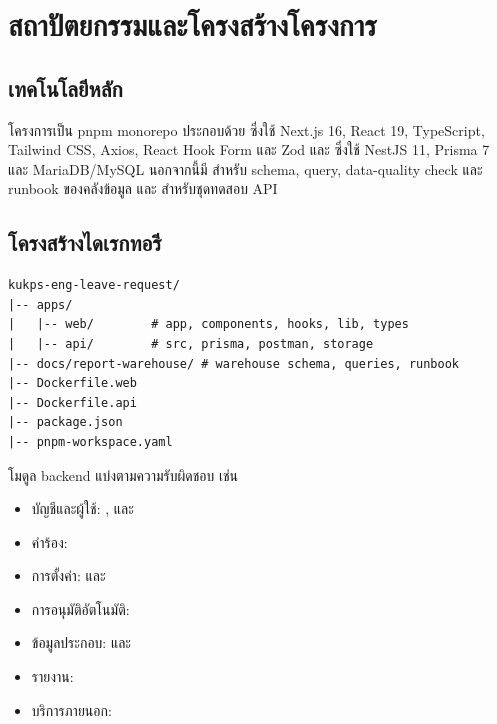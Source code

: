 \section{สถาปัตยกรรมและโครงสร้างโครงการ}
\subsection{เทคโนโลยีหลัก}
โครงการเป็น pnpm monorepo ประกอบด้วย  ซึ่งใช้ Next.js 16, React 19, TypeScript, Tailwind CSS, Axios, React Hook Form และ Zod และ  ซึ่งใช้ NestJS 11, Prisma 7 และ MariaDB/MySQL นอกจากนี้มี  สำหรับ schema, query, data-quality check และ runbook ของคลังข้อมูล และ  สำหรับชุดทดสอบ API

\subsection{โครงสร้างไดเรกทอรี}
\begin{lstlisting}
kukps-eng-leave-request/
|-- apps/
|   |-- web/        # app, components, hooks, lib, types
|   |-- api/        # src, prisma, postman, storage
|-- docs/report-warehouse/ # warehouse schema, queries, runbook
|-- Dockerfile.web
|-- Dockerfile.api
|-- package.json
|-- pnpm-workspace.yaml
\end{lstlisting}
โมดูล backend แบ่งตามความรับผิดชอบ เช่น
\begin{itemize}
  \item บัญชีและผู้ใช้: ,  และ 
  \item คำร้อง: 
  \item การตั้งค่า:  และ 
  \item การอนุมัติอัตโนมัติ: 
  \item ข้อมูลประกอบ:  และ 
  \item รายงาน: 
  \item บริการภายนอก: 
\end{itemize}

\newpage

